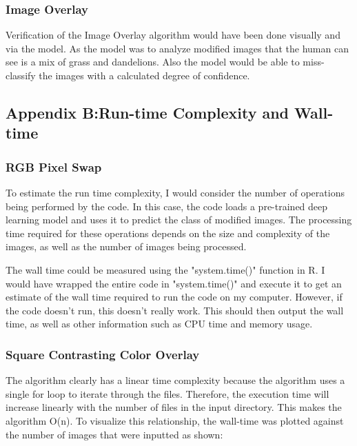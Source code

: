 \documentclass{article}
\begin{document}
\subsubsection{Image Overlay}
Verification of the Image Overlay algorithm would have been done visually and via the model. As the model was to analyze modified images that the human can see is a mix of grass and dandelions. Also the model would be able to miss-classify the images with a calculated degree of confidence. 

\subsection{Appendix B:Run-time Complexity and Wall-time}
\subsubsection{RGB Pixel Swap}
To estimate the run time complexity, I would consider the number of operations being performed by the code. In this case, the code loads a pre-trained deep learning model and uses it to predict the class of modified images. The processing time required for these operations depends on the size and complexity of the images, as well as the number of images being processed.

The wall time could be measured using the "system.time()" function in R. I would have wrapped the entire code in "system.time()" and execute it to get an estimate of the wall time required to run the code on my computer. However, if the code doesn't run, this doesn't really work. This should then output the wall time, as well as other information such as CPU time and memory usage.



\subsubsection{Square Contrasting Color Overlay}
The algorithm clearly has a linear time complexity because the algorithm uses a single for loop to iterate through the files. Therefore, the execution time will increase linearly with the number of files in the input directory. This makes the algorithm O(n). To visualize this relationship, the wall-time was plotted against the number of images that were inputted as shown:
\end{document}
